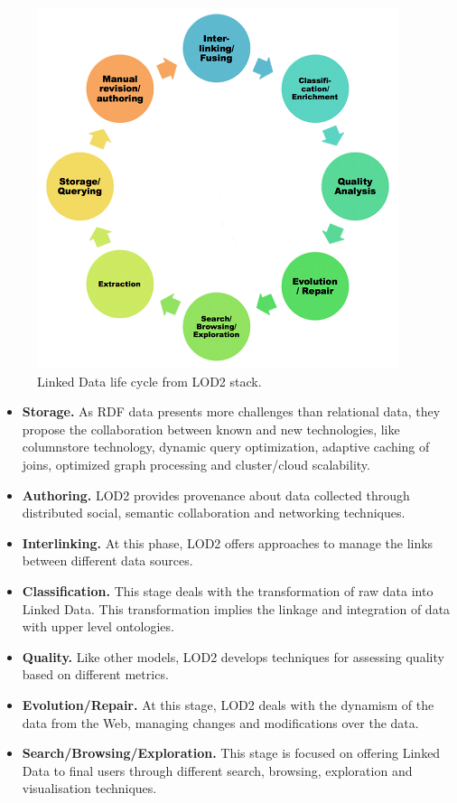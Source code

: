 \begin{figure}
    \center
    \includegraphics[scale=0.6]{img/data_lifecycle/lod2lifecyle1.png}
    \caption{Linked Data life cycle from LOD2 stack.}
    \label{fig:lod2}
\end{figure}

\begin{itemize}
    \item \textbf{Storage.} As RDF  data presents more challenges than relational data, they propose the collaboration between known and new technologies, like columnstore technology, dynamic query optimization, adaptive caching of joins, optimized graph processing and cluster/cloud scalability.

    \item \textbf{Authoring.} LOD2 provides provenance  about data collected through distributed social, semantic collaboration and networking techniques.

    \item \textbf{Interlinking.} At this phase, LOD2 offers approaches to manage the links between different data sources.

    \item \textbf{Classification.} This stage deals with the transformation of raw data into Linked Data. This transformation implies the linkage and integration of data with upper level ontologies.

    \item \textbf{Quality.} Like other models, LOD2 develops techniques for assessing quality based on different metrics.

    \item \textbf{Evolution/Repair.} At this stage, LOD2 deals with the dynamism of the data from the Web, managing changes and modifications over the data.

    \item \textbf{Search/Browsing/Exploration.} This stage is focused on offering Linked Data to final users through different search, browsing, exploration and visualisation techniques.
\end{itemize}

